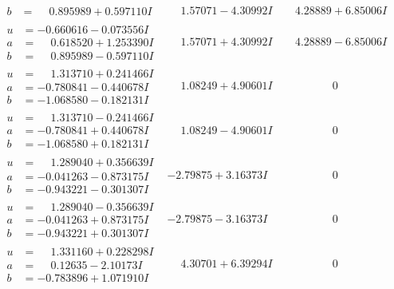 \documentclass[1p]{elsarticle_modified}
\theoremstyle{definition}
\begin{document}
$$\begin{array}{c|c|c}
\begin{aligned}
b &= \phantom{-}0.895989 + 0.597110 I\end{aligned}
 & \phantom{-}1.57071 - 4.30992 I & \phantom{-}4.28889 + 6.85006 I \\ \hline\begin{aligned}
u &= -0.660616 - 0.073556 I \\
a &= \phantom{-}0.618520 + 1.253390 I \\
b &= \phantom{-}0.895989 - 0.597110 I\end{aligned}
 & \phantom{-}1.57071 + 4.30992 I & \phantom{-}4.28889 - 6.85006 I \\ \hline\begin{aligned}
u &= \phantom{-}1.313710 + 0.241466 I \\
a &= -0.780841 - 0.440678 I \\
b &= -1.068580 - 0.182131 I\end{aligned}
 & \phantom{-}1.08249 + 4.90601 I & \phantom{-0.000000 } 0 \\ \hline\begin{aligned}
u &= \phantom{-}1.313710 - 0.241466 I \\
a &= -0.780841 + 0.440678 I \\
b &= -1.068580 + 0.182131 I\end{aligned}
 & \phantom{-}1.08249 - 4.90601 I & \phantom{-0.000000 } 0 \\ \hline\begin{aligned}
u &= \phantom{-}1.289040 + 0.356639 I \\
a &= -0.041263 - 0.873175 I \\
b &= -0.943221 - 0.301307 I\end{aligned}
 & -2.79875 + 3.16373 I & \phantom{-0.000000 } 0 \\ \hline\begin{aligned}
u &= \phantom{-}1.289040 - 0.356639 I \\
a &= -0.041263 + 0.873175 I \\
b &= -0.943221 + 0.301307 I\end{aligned}
 & -2.79875 - 3.16373 I & \phantom{-0.000000 } 0 \\ \hline\begin{aligned}
u &= \phantom{-}1.331160 + 0.228298 I \\
a &= \phantom{-}0.12635 - 2.10173 I \\
b &= -0.783896 + 1.071910 I\end{aligned}
 & \phantom{-}4.30701 + 6.39294 I & \phantom{-0.000000 } 0 \\ \hline\begin{aligned}

\end{aligned}
\end{array}$$
\end{document}
